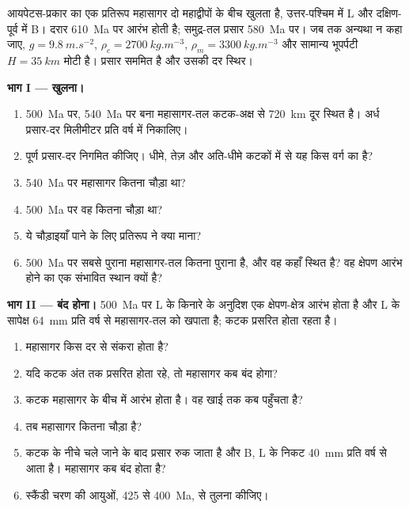\begin{problem}\label{pb:b2:wilson-cycle:1}
आयपेटस-प्रकार का एक प्रतिरूप महासागर दो महाद्वीपों के बीच खुलता है, उत्तर-पश्चिम में L और
दक्षिण-पूर्व में B। दरार \qty{610}{Ma} पर आरंभ होती है; समुद्र-तल प्रसार \qty{580}{Ma} पर।
जब तक अन्यथा न कहा जाए, $g = \qty{9.8}{m.s^{-2}}$, $\rho_c = \qty{2700}{kg.m^{-3}}$, $\rho_m =
\qty{3300}{kg.m^{-3}}$ और सामान्य भूपर्पटी $H = \qty{35}{km}$ मोटी है। प्रसार
सममित है और उसकी दर स्थिर।

\medskip
\noindent\textbf{भाग I --- खुलना।}
\begin{enumerate}
\item \qty{500}{Ma} पर, \qty{540}{Ma} पर बना महासागर-तल कटक-अक्ष से \qty{720}{km} दूर
स्थित है। अर्ध प्रसार-दर मिलीमीटर प्रति वर्ष में निकालिए।
\item पूर्ण प्रसार-दर निगमित कीजिए। धीमे,
तेज़ और अति-धीमे कटकों में से यह किस वर्ग का है?
\item \qty{540}{Ma} पर महासागर कितना चौड़ा था?
\item \qty{500}{Ma} पर वह कितना चौड़ा था?
\item ये चौड़ाइयाँ पाने के लिए प्रतिरूप ने क्या माना?
\item \qty{500}{Ma} पर सबसे पुराना महासागर-तल कितना पुराना है, और वह कहाँ स्थित है? वह
क्षेपण आरंभ होने का एक संभावित स्थान क्यों है?
\end{enumerate}

\noindent\textbf{भाग II --- बंद होना।} \qty{500}{Ma} पर L के किनारे के अनुदिश एक क्षेपण-क्षेत्र आरंभ होता है
और L के सापेक्ष \qty{64}{mm} प्रति वर्ष से महासागर-तल को खपाता है; कटक
प्रसरित होता रहता है।
\begin{enumerate}[resume]
\item महासागर किस दर से संकरा होता है?
\item यदि कटक अंत तक प्रसरित होता रहे, तो महासागर कब बंद होगा?
\item कटक महासागर के बीच में आरंभ होता है। वह खाई तक कब पहुँचता है?
\item तब महासागर कितना चौड़ा है?
\item कटक के नीचे चले जाने के बाद प्रसार रुक जाता है और B, L के निकट \qty{40}{mm} प्रति
वर्ष से आता है। महासागर कब बंद होता है?
\item स्कैंडी चरण की आयुओं, 425 से \qty{400}{Ma}, से तुलना कीजिए।
\end{enumerate}


\end{problem}
